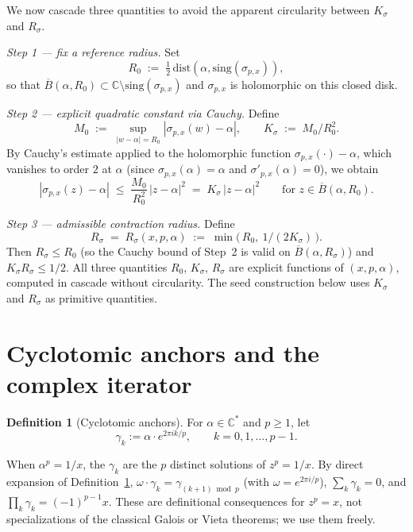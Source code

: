 \documentclass[11pt,a4paper]{article}
\theoremstyle{definition}
\newtheorem{definition}{Definition}[section]
\begin{document}
We now cascade three quantities to avoid the apparent circularity between $K_\sigma$ and $R_\sigma$.

\medskip
\noindent\emph{Step 1 — fix a reference radius.} Set
\[
  R_0 \;:=\; \tfrac12\,\mathrm{dist}(\alpha, \mathrm{sing}(\sigma_{p,x})),
\]
so that $\overline{B}(\alpha, R_0) \subset \mathbb{C} \setminus \mathrm{sing}(\sigma_{p,x})$ and $\sigma_{p,x}$ is holomorphic on this closed disk.

\noindent\emph{Step 2 — explicit quadratic constant via Cauchy.} Define
\[
  M_0 \;:=\; \sup_{|w - \alpha| = R_0} |\sigma_{p,x}(w) - \alpha|,
  \qquad
  K_\sigma \;:=\; M_0 / R_0^2.
\]
By Cauchy's estimate applied to the holomorphic function $\sigma_{p,x}(\cdot) - \alpha$, which vanishes to order $2$ at $\alpha$ (since $\sigma_{p,x}(\alpha) = \alpha$ and $\sigma'_{p,x}(\alpha) = 0$), we obtain
\[
  |\sigma_{p,x}(z) - \alpha|
  \;\leq\; \frac{M_0}{R_0^2}\,|z - \alpha|^2
  \;=\; K_\sigma\,|z - \alpha|^2
  \qquad \text{for } z \in \overline{B}(\alpha, R_0).
\]

\noindent\emph{Step 3 — admissible contraction radius.} Define
\[
  R_\sigma \;=\; R_\sigma(x, p, \alpha) \;:=\; \min\!\bigl(\,R_0,\ 1/(2K_\sigma)\,\bigr).
\]
Then $R_\sigma \leq R_0$ (so the Cauchy bound of Step~2 is valid on $\overline{B}(\alpha, R_\sigma)$) and $K_\sigma R_\sigma \leq 1/2$. All three quantities $R_0$, $K_\sigma$, $R_\sigma$ are explicit functions of $(x, p, \alpha)$, computed in cascade without circularity. The seed construction below uses $K_\sigma$ and $R_\sigma$ as primitive quantities.

\section{Cyclotomic anchors and the complex iterator}
\label{sec:cyclotomic}

\begin{definition}[Cyclotomic anchors]\label{def:cyc-anchor}
For $\alpha \in \mathbb{C}^\ast$ and $p \geq 1$, let
\[
  \gamma_k := \alpha \cdot e^{2\pi i k / p}, \qquad k = 0, 1, \dots, p-1.
\]
\end{definition}

When $\alpha^p = 1/x$, the $\gamma_k$ are the $p$ distinct solutions of $z^p = 1/x$. By direct expansion of Definition~\ref{def:cyc-anchor}, $\omega \cdot \gamma_k = \gamma_{(k+1)\bmod p}$ (with $\omega = e^{2\pi i/p}$), $\sum_k \gamma_k = 0$, and $\prod_k \gamma_k = (-1)^{p-1} x$. These are definitional consequences for $z^p = x$, not specializations of the classical Galois or Vieta theorems; we use them freely.
\end{document}
